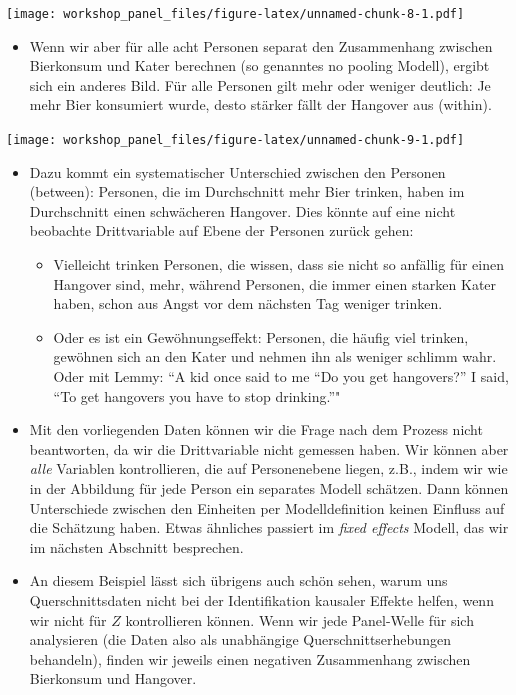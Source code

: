 \documentclass[
]{book}
\providecommand{\tightlist}{%
  \setlength{\itemsep}{0pt}\setlength{\parskip}{0pt}}
\begin{document}
\texttt{[image: workshop\_panel\_files/figure-latex/unnamed-chunk-8-1.pdf]}

\begin{itemize}
\tightlist
\item
  Wenn wir aber für alle acht Personen separat den Zusammenhang zwischen Bierkonsum und Kater berechnen (so genanntes no pooling Modell), ergibt sich ein anderes Bild. Für alle Personen gilt mehr oder weniger deutlich: Je mehr Bier konsumiert wurde, desto stärker fällt der Hangover aus (within).
\end{itemize}

\texttt{[image: workshop\_panel\_files/figure-latex/unnamed-chunk-9-1.pdf]}

\begin{itemize}
\item
  Dazu kommt ein systematischer Unterschied zwischen den Personen (between): Personen, die im Durchschnitt mehr Bier trinken, haben im Durchschnitt einen schwächeren Hangover. Dies könnte auf eine nicht beobachte Drittvariable auf Ebene der Personen zurück gehen:

  \begin{itemize}
  \tightlist
  \item
    Vielleicht trinken Personen, die wissen, dass sie nicht so anfällig für einen Hangover sind, mehr, während Personen, die immer einen starken Kater haben, schon aus Angst vor dem nächsten Tag weniger trinken.
  \item
    Oder es ist ein Gewöhnungseffekt: Personen, die häufig viel trinken, gewöhnen sich an den Kater und nehmen ihn als weniger schlimm wahr. Oder mit Lemmy: ``A kid once said to me ``Do you get hangovers?'' I said, ``To get hangovers you have to stop drinking.''"
  \end{itemize}
\item
  Mit den vorliegenden Daten können wir die Frage nach dem Prozess nicht beantworten, da wir die Drittvariable nicht gemessen haben. Wir können aber \emph{alle} Variablen kontrollieren, die auf Personenebene liegen, z.B., indem wir wie in der Abbildung für jede Person ein separates Modell schätzen. Dann können Unterschiede zwischen den Einheiten per Modelldefinition keinen Einfluss auf die Schätzung haben. Etwas ähnliches passiert im \emph{fixed effects} Modell, das wir im nächsten Abschnitt besprechen.
\item
  An diesem Beispiel lässt sich übrigens auch schön sehen, warum uns Querschnittsdaten nicht bei der Identifikation kausaler Effekte helfen, wenn wir nicht für \(Z\) kontrollieren können. Wenn wir jede Panel-Welle für sich analysieren (die Daten also als unabhängige Querschnittserhebungen behandeln), finden wir jeweils einen negativen Zusammenhang zwischen Bierkonsum und Hangover.
\end{itemize}
\end{document}
